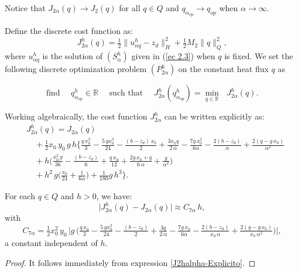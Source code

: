 \documentclass[axioms,article,submit,moreauthors]{Definitions/mdpi}
\begin{document}
 \begin{Remark} Notice that $J_{2\alpha}(q)\to J_2(q) $ for all $q\in Q$ and $q_{\alpha_{op}}\to q_{op}$ when $\alpha \to \infty$. 
\end{Remark}   
   
     
  
    
       \noindent Define the discrete cost function as:
\begin{equation}    
   {  J^h_{2 \alpha}} (q)=  \tfrac{1}{2} \lVert {u^h_{\alpha q}} - z_d \rVert^2_H +  \tfrac{1}{2} M_2 \lVert q \rVert ^2_Q ,
     \end{equation}
where {$u^h_{\alpha q}$} is the solution of ${(S^h_{\alpha})}$ given in (\ref{ec 2.3}) {when $q$ is fixed}. We set the following discrete optimization problem 
 ${(P^h_{2\alpha})}$ on the constant heat flux $q$ as

\[ \text{find }\quad { q^h_{\alpha_{op}}}\in \mathbb{R}\quad\text{ such that }\quad
{ J^h_{2 \alpha}}({ q^h_{\alpha_{op}}})=\min\limits_{q\in \mathbb{R}} \text{ }{ J^h_{2 \alpha}}({q}).
\]
  
    
    
  
  
  Working algebraically, the cost function ${ J^h_{2 \alpha}}$ can be written explicitly as:
  \begin{equation}\label{J2halpha-Explicito}
  \begin{array}{rl}
&  { J^h_{2 \alpha}}(q)= J_{2\alpha}(q) \\[0.45cm]
  &\quad+ \tfrac{1}{2} x_0\,y_0 \,g \,h \Big \{   \tfrac{ q\,x_0^2}{3}   - \tfrac{5\,g x_0^3}{24}  - \tfrac{(b-z_d)\,x_0}{2} 
    + \tfrac{3 x_0 q}{2\,\alpha} - \tfrac{7 g\,x_0^2}{6\alpha}
     - \tfrac{2(b-z_d)}{\alpha}+ \tfrac{2(q-g\,x_0)}{\alpha^2} \\[0.45cm]
    & \quad + h \Big( \tfrac{x_0^2\, g}{36}-  \tfrac{(b-z_d)}{6} + \tfrac{q \,x_0}{12} + \tfrac{2g\,x_0+q}{6\,\alpha}+\tfrac{g}{\alpha^2}\Big)\\[0.45cm]
    & \quad + h^2\,g \Big( \tfrac{x_0}{24} + \tfrac{1}{6\alpha} \Big) + \tfrac{1}{180} g\, h^3 \Big\}. 
    \end{array}
    \end{equation}
     

  
\begin{Lemma}\label{Lema 4.4} For each $q\in Q$  and $h>0$, we have:
\begin{equation}   \lvert  { J^h_{2 \alpha}}(q) - J_{2\alpha}(q) \rvert  \approx C_{7 \alpha} \, h, 
   \end{equation}
      with \[C_{7 \alpha} = \tfrac{1}{2}x_0^2\, y_0\, \Big \lvert g \,  \Big(  \tfrac{ q\,x_0}{3}   - \tfrac{5\,g x_0^2}{24}  - \tfrac{(b-z_d)}{2}+ \tfrac{3 q}{2\,\alpha} - \tfrac{7 g\,x_0}{6\alpha} - \tfrac{2(b-z_d)}{x_0 \,\alpha}+ \tfrac{2(q-g\,x_0)}{x_0\,\alpha^2}\Big)    \Big \rvert, \] a constant independent of $h.$      
  
\end{Lemma}
\begin{proof}
It follows immediately from expression \eqref{J2halpha-Explicito}.
\end{proof}
\end{document}
